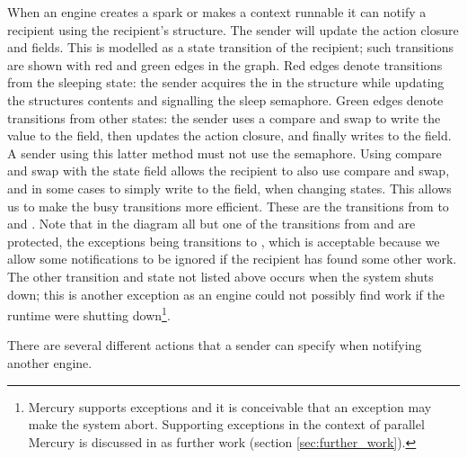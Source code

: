 When an engine creates a spark or makes a context runnable
it can notify a recipient using the recipient's
\enginesleepsync structure.
The sender will update the action closure and
 fields.
This is modelled as a state transition of the recipient;
such transitions are shown with red and green edges in the graph.
Red edges denote transitions from the sleeping state:
the sender acquires the  in the
\enginesleepsync structure while updating the structures contents and
signalling the sleep semaphore. 
Green edges denote transitions from other states:
the sender uses a compare and swap to write the  value to the
 field,
then updates the action closure,
and finally writes  to the  field.
A sender using this latter method must not use the semaphore.
Using compare and swap with the state field allows the recipient to also
use compare and swap, and in some cases to simply write to the field,
when changing states.
This allows us to make the busy transitions more efficient.
These are the transitions from 
 to
 and 
.
Note that in the diagram all but one of the transitions from
 and 
are protected,
the exceptions being transitions to ,
which is acceptable because we allow some notifications to be ignored if the
recipient has found some other work.
The other transition and state not listed above occurs when the system shuts
down;
this is another exception as an engine could not possibly find work if the
runtime were shutting down\footnote{
    Mercury supports exceptions and it is conceivable that an exception may
    make the system abort.
    Supporting exceptions in the context of parallel Mercury is discussed in
    as further work (section \ref{sec:further_work}).
}.

There are several different actions that a sender can specify when notifying
another engine.

